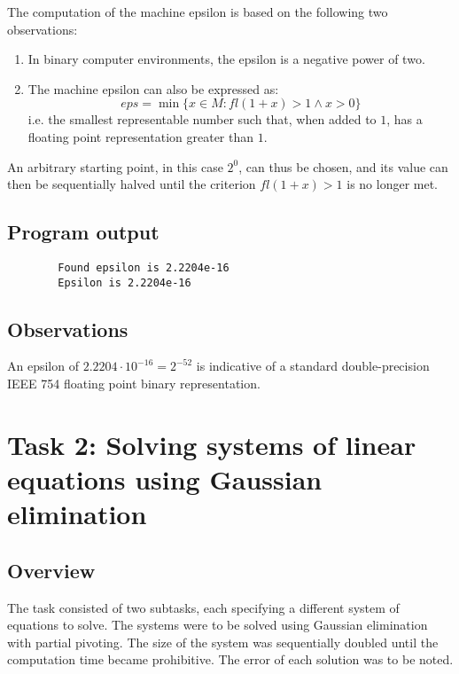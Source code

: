 \documentclass{article}
\begin{document}
	The computation of the machine epsilon is based on the following two
	observations:
	
	\begin{enumerate}
		\item In binary computer environments, the epsilon is a negative power
		of two.
		\item The machine epsilon can also be expressed as:
		\begin{equation}
			eps = \min\{x \in M: fl(1 + x) > 1 \land x > 0\}
		\end{equation}
		i.e. the smallest representable number such that, when added to $1$,
		has a floating point representation greater than $1$.
	\end{enumerate}
	
	An arbitrary starting point, in this case $2^0$, can thus be chosen, and its
	value can then be sequentially halved until the criterion $fl(1 + x) > 1$ is
	no longer met.
	
	\subsection{Program output}
	
	\begin{verbatim}
		Found epsilon is 2.2204e-16
		Epsilon is 2.2204e-16
	\end{verbatim}
	
	\subsection{Observations}
	
	An epsilon of $2.2204 \cdot 10^{-16} = 2^{-52}$ is indicative of a standard
	double-precision IEEE 754 floating point binary representation.
	
	\newpage
	
	\section{Task 2: Solving systems of linear equations using Gaussian
	elimination}
	
	\subsection{Overview}
	
	The task consisted of two subtasks, each specifying a different system
	of equations to solve. The systems were to be solved using Gaussian
	elimination with partial pivoting. The size of the system was sequentially
	doubled until the computation time became prohibitive. The error of each
	solution was to be noted.
	
\end{document}
